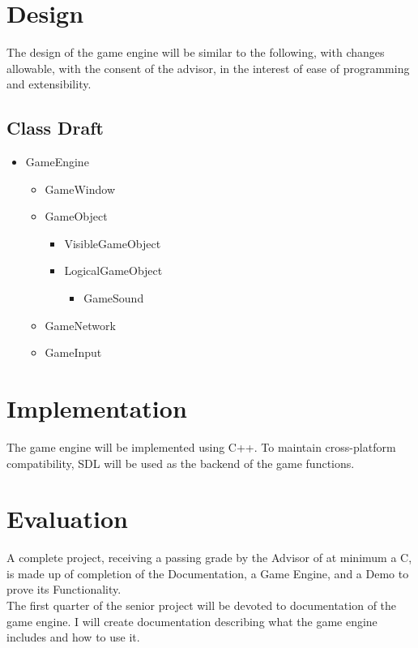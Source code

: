 \documentclass[12pt]{article}
\begin{document}
  \section{Design}
    The design of the game engine will be similar to the following, with changes allowable, with the consent of the advisor, in the interest of ease of programming and extensibility.

    \subsection{Class Draft}
      \begin{itemize}
	\item GameEngine
	\begin{itemize}
	  \item GameWindow
	  \item GameObject
	  \begin{itemize}
	    \item VisibleGameObject
	    \item LogicalGameObject
	    \begin{itemize}
	      \item GameSound
	    \end{itemize}
	  \end{itemize}
	  \item GameNetwork
	  \item GameInput
	\end{itemize}
      \end{itemize}

  \section{Implementation}
    The game engine will be implemented using C++. To maintain cross-platform compatibility, SDL will be used as the backend of the game functions.

  \section{Evaluation}
    A complete project, receiving a passing grade by the Advisor of at minimum a C, is made up of completion of the Documentation, a Game Engine, and a Demo to prove its Functionality.\\

    The first quarter of the senior project will be devoted to documentation of the game engine. I will create documentation describing what the game engine includes and how to use it.
\end{document}
